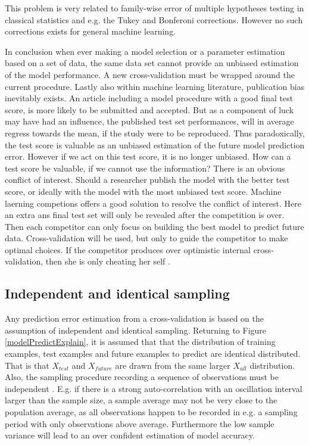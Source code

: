 This problem is very related to family-wise error of multiple hypotheses testing in classical statistics and e.g. the Tukey and Bonferoni corrections. However no such corrections exists for general machine learning.

In conclusion when ever making a model selection or a parameter estimation based on a set of data, the same data set cannot provide an unbiased estimation of the model performance. A new cross-validation must be wrapped around the current procedure. Lastly also within machine learning literature, publication bias inevitably exists. An article including a model procedure with a good final test score, is more likely to be submitted and accepted. But as a component of luck may have had an influence, the published test set performances, will in average regress towards the mean, if the study were to be reproduced. Thus paradoxically, the test score is valuable as an unbiased estimation of the future model prediction error. However if we act on this test score, it is no longer unbiased. How can a test score be valuable, if we cannot use the information? There is an obvious conflict of interest. Should a researcher publish the model with the better test score, or ideally with the model with the most unbiased test score. Machine laerning competions offers a good solution to resolve the conflict of interest. Here an extra ans final test set will only be revealed after the competition is over. Then each competitor can only focus on building the best model to predict future data. Cross-validation will be used, but only to guide the competitor to make optimal choices. If the competitor produces over optimistic internal cross-validation, then she is only cheating her self \cite{seroussi2015steps}.

\subsection{Independent and identical sampling}
\label{iid}
Any prediction error estimation from a cross-validation is based on the assumption of independent and identical sampling. Returning to Figure \ref{modelPredictExplain}, it is assumed that that the distribution of training examples, test examples and future examples to predict are identical distributed. That is that $X_{test}$ and $X_{future}$ are drawn from the same larger $X_{all}$ distribution. Also, the sampling procedure recording a sequence of observations must be independent \cite{le2010performance}. E.g. if there is a strong auto-correlation with an oscillation interval larger than the sample size, a sample average may not be very close to the population average, as all observations happen to be recorded in e.g. a sampling period with only observations above average. Furthermore the low sample variance will lead to an over confident estimation of model accuracy.

